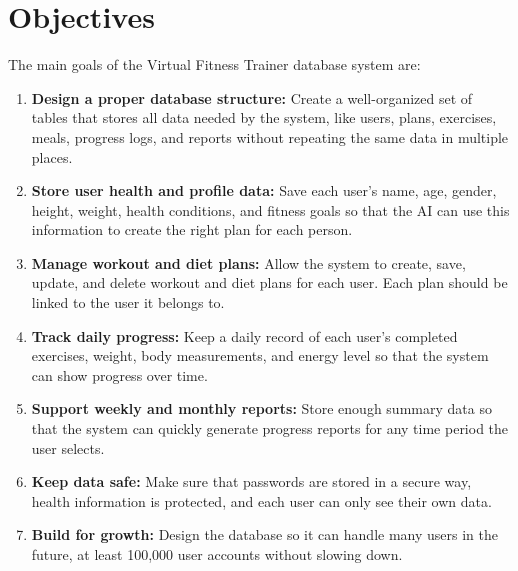 \documentclass[12pt,a4paper]{article}
\begin{document}
\section{Objectives}

The main goals of the Virtual Fitness Trainer database system are:

\begin{enumerate}[leftmargin=*, label=\textbf{O-\arabic*.}]

  \item \textbf{Design a proper database structure:} Create a well-organized set of tables
  that stores all data needed by the system, like users, plans, exercises, meals, progress
  logs, and reports without repeating the same data in multiple places.

  \item \textbf{Store user health and profile data:} Save each user's name, age, gender,
  height, weight, health conditions, and fitness goals so that the AI can use this
  information to create the right plan for each person.

  \item \textbf{Manage workout and diet plans:} Allow the system to create, save, update,
  and delete workout and diet plans for each user. Each plan should be linked to the user
  it belongs to.

  \item \textbf{Track daily progress:} Keep a daily record of each user's completed
  exercises, weight, body measurements, and energy level so that the system can show
  progress over time.

  \item \textbf{Support weekly and monthly reports:} Store enough summary data so that
  the system can quickly generate progress reports for any time period the user selects.

  \item \textbf{Keep data safe:} Make sure that passwords are stored in a secure way,
  health information is protected, and each user can only see their own data.

  \item \textbf{Build for growth:} Design the database so it can handle many users in the
  future, at least 100,000 user accounts without slowing down.

\end{enumerate}

\end{document}
